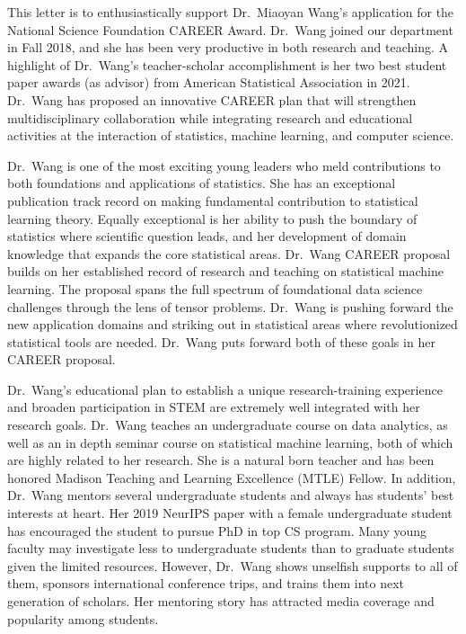 \documentclass{article}
\begin{document}
This letter is to enthusiastically support Dr.\ Miaoyan Wang's application for the National Science Foundation CAREER Award. Dr.\ Wang joined our department in Fall 2018, and she has been very productive in both research and teaching.  A highlight of Dr.\ Wang's teacher-scholar accomplishment is her two best student paper awards (as advisor) from American Statistical Association in 2021. Dr.\ Wang has proposed an innovative CAREER plan that will strengthen multidisciplinary collaboration while integrating research and educational activities at the interaction of statistics, machine learning, and computer science. 

Dr.\ Wang is one of the most exciting young leaders who meld contributions to both foundations and applications of statistics. She has an exceptional publication track record on making fundamental contribution to statistical learning theory. Equally exceptional is her ability to push the boundary of statistics where scientific question leads, and her development of domain knowledge that expands the core statistical areas. Dr.\ Wang CAREER proposal builds on her established record of research and teaching on statistical machine learning. The proposal spans the full spectrum of foundational data science challenges through the lens of tensor problems. Dr.\ Wang is pushing forward the new application domains and striking out in statistical areas where revolutionized statistical tools are needed. Dr.\ Wang puts forward both of these goals in her CAREER proposal. 

Dr.\ Wang's educational plan to establish a unique research-training experience and broaden participation in STEM are extremely well integrated with her research goals. Dr.\ Wang teaches an undergraduate course on data analytics, as well as an in depth seminar course on statistical machine learning, both of which are highly related to her research. She is a natural born teacher and has been honored Madison Teaching and Learning Excellence (MTLE) Fellow. In addition, Dr.\ Wang mentors several undergraduate students and always has students' best interests at heart. Her 2019 NeurIPS paper with a female undergraduate student has encouraged the student to pursue PhD in top CS program. Many young faculty may investigate less to undergraduate students than to graduate students given the limited resources. However, Dr.\ Wang shows unselfish supports to all of them, sponsors international conference trips, and trains them into next generation of scholars. Her mentoring story has attracted media coverage and popularity among students. 
\end{document}
